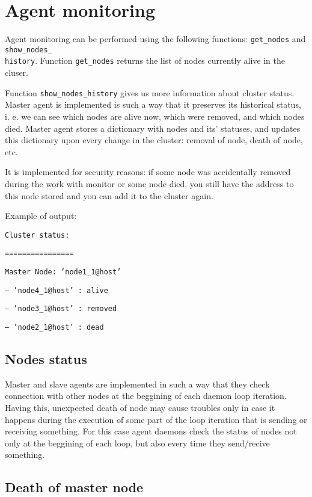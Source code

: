 \documentclass[12pt]{article}
\begin{document}
\section{Agent monitoring}

Agent monitoring can be performed using the following functions: \texttt{get\_nodes} and \texttt{show\_nodes\_\\history}. Function \texttt{get\_nodes} returns the list of nodes currently alive in the cluser.

Function \texttt{show\_nodes\_history} gives us more information about cluster status. Master agent is implemented is such a way that it preserves its historical status, i. e. we can see which nodes are alive now, which were removed, and which nodes died. Master agent stores a dictionary with nodes and its' statuses, and updates this dictionary upon every change in the cluster: removal of node, death of node, etc.

It is implemented for security reasons: if some node was accidentally removed during the work with monitor or some node died, you still have the address to this node stored and you can add it to the cluster again.

Example of output:

\texttt{Cluster status: }

\texttt{================}

\texttt{Master Node: 'node1\_1@host'}

\texttt{--- 'node4\_1@host' : alive}

\texttt{--- 'node3\_1@host' : removed}

\texttt{--- 'node2\_1@host' : dead}



\subsection{Nodes status}

Master and slave agents are implemented in such a way that they check connection with other nodes at the beggining of each daemon loop iteration. Having this, unexpected death of node may cause troubles only in case it happens during the execution of some part of the loop iteration that is sending or receiving something. For this case agent daemons check the status of nodes not only at the beggining of each loop, but also every time they send/recive something.

\subsection{Death of master node}
\end{document}
